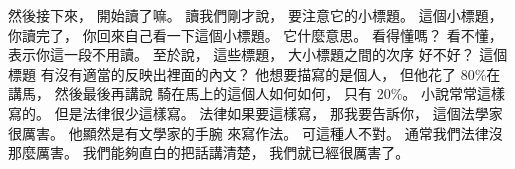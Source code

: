 \hypertarget{w01:cue:2767}{}然後接下來，
\hypertarget{w01:cue:2768}{}開始讀了嘛。
\hypertarget{w01:cue:2769}{}讀我們剛才說，
\hypertarget{w01:cue:2770}{}要注意它的小標題。
\hypertarget{w01:cue:2771}{}這個小標題，
\hypertarget{w01:cue:2772}{}你讀完了，
\hypertarget{w01:cue:2773}{}你回來自己看一下這個小標題。
\hypertarget{w01:cue:2774}{}它什麼意思。
\hypertarget{w01:cue:2775}{}看得懂嗎？
\hypertarget{w01:cue:2776}{}看不懂，
\hypertarget{w01:cue:2777}{}表示你這一段不用讀。
\hypertarget{w01:cue:2778}{}至於說，
\hypertarget{w01:cue:2779}{}這些標題，
\hypertarget{w01:cue:2780}{}大小標題之間的次序
\hypertarget{w01:cue:2781}{}好不好？
\hypertarget{w01:cue:2782}{}這個標題
\hypertarget{w01:cue:2783}{}有沒有適當的反映出裡面的內文？
\hypertarget{w01:cue:2784}{}他想要描寫的是個人，
\hypertarget{w01:cue:2785}{}但他花了 80\%在講馬，
\hypertarget{w01:cue:2786}{}然後最後再講說
\hypertarget{w01:cue:2787}{}騎在馬上的這個人如何如何，
\hypertarget{w01:cue:2788}{}只有 20\%。
\hypertarget{w01:cue:2789}{}小說常常這樣寫的。
\hypertarget{w01:cue:2790}{}但是法律很少這樣寫。
\hypertarget{w01:cue:2791}{}法律如果要這樣寫，
\hypertarget{w01:cue:2792}{}那我要告訴你，
\hypertarget{w01:cue:2793}{}這個法學家很厲害。
\hypertarget{w01:cue:2794}{}他顯然是有文學家的手腕
\hypertarget{w01:cue:2795}{}來寫作法。
\hypertarget{w01:cue:2796}{}可這種人不對。
\hypertarget{w01:cue:2797}{}通常我們法律沒那麼厲害。
\hypertarget{w01:cue:2798}{}我們能夠直白的把話講清楚，
\hypertarget{w01:cue:2799}{}我們就已經很厲害了。

